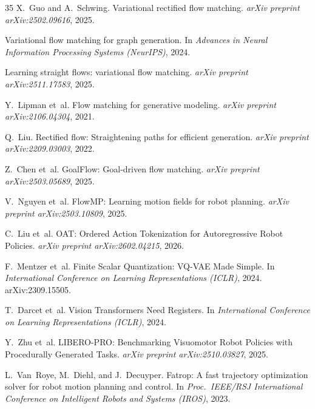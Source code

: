 \documentclass[11pt]{article}
\begin{document}
\begin{thebibliography}{35}
  X.~Guo and A.~Schwing.
  \newblock Variational rectified flow matching.
  \newblock \emph{arXiv preprint arXiv:2502.09616}, 2025.

  \newblock Variational flow matching for graph generation.
  \newblock In \emph{Advances in Neural Information Processing Systems (NeurIPS)}, 2024.

  \newblock Learning straight flows: variational flow matching.
  \newblock \emph{arXiv preprint arXiv:2511.17583}, 2025.

  Y.~Lipman et~al.
  \newblock Flow matching for generative modeling.
  \newblock \emph{arXiv preprint arXiv:2106.04304}, 2021.

  Q.~Liu.
  \newblock Rectified flow: Straightening paths for efficient generation.
  \newblock \emph{arXiv preprint arXiv:2209.03003}, 2022.

  Z.~Chen et~al.
  \newblock GoalFlow: Goal-driven flow matching.
  \newblock \emph{arXiv preprint arXiv:2503.05689}, 2025.

  V.~Nguyen et~al.
  \newblock FlowMP: Learning motion fields for robot planning.
  \newblock \emph{arXiv preprint arXiv:2503.10809}, 2025.

  C.~Liu et~al.
  \newblock OAT: Ordered Action Tokenization for Autoregressive Robot Policies.
  \newblock \emph{arXiv preprint arXiv:2602.04215}, 2026.

  F.~Mentzer et~al.
  \newblock Finite Scalar Quantization: VQ-VAE Made Simple.
  \newblock In \emph{International Conference on Learning Representations (ICLR)}, 2024.
  \newblock arXiv:2309.15505.

  T.~Darcet et~al.
  \newblock Vision Transformers Need Registers.
  \newblock In \emph{International Conference on Learning Representations (ICLR)}, 2024.

  Y.~Zhu et~al.
  \newblock LIBERO-PRO: Benchmarking Visuomotor Robot Policies with Procedurally Generated Tasks.
  \newblock \emph{arXiv preprint arXiv:2510.03827}, 2025.

  L.~Van~Roye, M.~Diehl, and J.~Decuyper.
  \newblock Fatrop: A fast trajectory optimization solver for robot motion planning and control.
  \newblock In \emph{Proc.\ IEEE/RSJ International Conference on Intelligent Robots and Systems (IROS)}, 2023.


\end{thebibliography}
\end{document}
